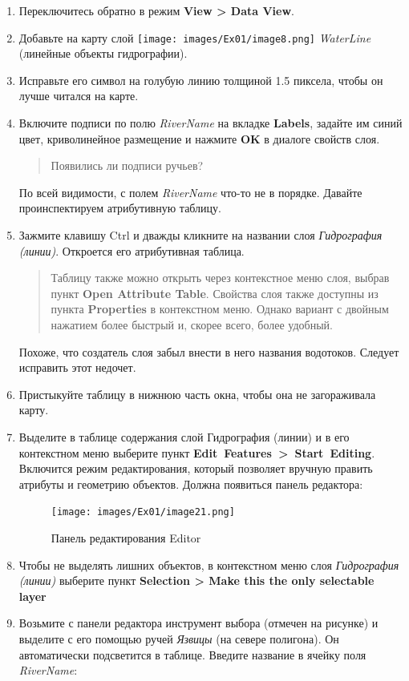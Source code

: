 \documentclass[12pt,]{book}
\begin{document}
\begin{enumerate}
\def\labelenumi{\arabic{enumi}.}
\item
  Переключитесь обратно в режим \textbf{View \textgreater{} Data View}.
\item
  Добавьте на карту слой \texttt{[image: images/Ex01/image8.png]} \emph{WaterLine} (линейные объекты гидрографии).
\item
  Исправьте его символ на голубую линию толщиной 1.5 пиксела, чтобы он лучше читался на карте.
\item
  Включите подписи по полю \emph{RiverName} на вкладке \textbf{Labels}, задайте им синий цвет, криволинейное размещение и нажмите \textbf{OK} в диалоге свойств слоя.

  \begin{quote}
  Появились ли подписи ручьев?
  \end{quote}

  По всей видимости, с полем \emph{RiverName} что-то не в порядке. Давайте проинспектируем атрибутивную таблицу.
\item
  Зажмите клавишу Ctrl и дважды кликните на названии слоя \emph{Гидрография (линии)}. Откроется его атрибутивная таблица.

  \begin{quote}
  Таблицу также можно открыть через контекстное меню слоя, выбрав пункт \textbf{Open Attribute Table}. Свойства слоя также доступны из пункта \textbf{Properties} в контекстном меню. Однако вариант с двойным нажатием более быстрый и, скорее всего, более удобный.
  \end{quote}

  Похоже, что создатель слоя забыл внести в него названия водотоков. Следует исправить этот недочет.
\item
  Пристыкуйте таблицу в нижнюю часть окна, чтобы она не загораживала карту.
\item
  Выделите в таблице содержания слой Гидрография (линии) и в его контекстном меню выберите пункт \textbf{Edit~Features~\textgreater{}~Start~Editing}. Включится режим редактирования, который позволяет вручную править атрибуты и геометрию объектов. Должна появиться панель редактора:

  \begin{figure}
  \centering
  \texttt{[image: images/Ex01/image21.png]}
  \caption{Панель редактирования Editor}
  \end{figure}
\item
  Чтобы не выделять лишних объектов, в контекстном меню слоя \emph{Гидрография (линии)} выберите пункт \textbf{Selection \textgreater{} Make this the only selectable layer}
\item
  Возьмите с панели редактора инструмент выбора (отмечен на рисунке) и выделите с его помощью ручей \emph{Язвицы} (на севере полигона). Он автоматически подсветится в таблице. Введите название в ячейку поля \emph{RiverName}:


\end{enumerate}
\end{document}
